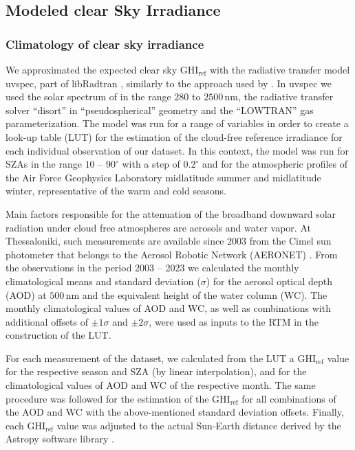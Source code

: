 \documentclass[preprint, 5p,
authoryear]{elsarticle} %
\begin{document}
\hypertarget{rtmcs}{%
\subsection{Modeled clear Sky Irradiance}\label{rtmcs}}

\hypertarget{climatology-of-clear-sky-irradiance}{%
\subsubsection{Climatology of clear sky
irradiance}\label{climatology-of-clear-sky-irradiance}}

We approximated the expected clear sky \(\text{GHI}_\text{ref}\) with
the radiative transfer model uvspec, part of libRadtran
\citep{Emde2016}, similarly to the approach used by
\citet{Vamvakas2020}. In uvspec we used the solar spectrum of
\citet{Kurucz1994} in the range \(280\) to \(2500\,\text{nm}\), the
radiative transfer solver ``disort'' in ``pseudospherical'' geometry and
the ``LOWTRAN'' gas parameterization. The model was run for a range of
variables in order to create a look-up table (LUT) for the estimation of
the cloud-free reference irradiance for each individual observation of
our dataset. In this context, the model was run for SZAs in the range
\(10\) -- \(90^\circ\) with a step of \(0.2^\circ\) and for the
atmospheric profiles of the Air Force Geophysics Laboratory
\citep{Anderson1986} midlatitude summer and midlatitude winter,
representative of the warm and cold seasons.

Main factors responsible for the attenuation of the broadband downward
solar radiation under cloud free atmospheres are aerosols and water
vapor. At Thessaloniki, such measurements are available since 2003 from
the Cimel sun photometer that belongs to the Aerosol Robotic Network
(AERONET) \citep{Giles2019, Buis1998}. From the observations in the
period 2003 -- 2023 we calculated the monthly climatological means and
standard deviation (\(\sigma\)) for the aerosol optical depth (AOD) at
\(500\,\text{nm}\) and the equivalent height of the water column (WC).
The monthly climatological values of AOD and WC, as well as combinations
with additional offsets of \(\pm1\sigma\) and \(\pm2\sigma\), were used
as inputs to the RTM in the construction of the LUT.

For each measurement of the dataset, we calculated from the LUT a
\(\text{GHI}_\text{ref}\) value for the respective season and SZA (by
linear interpolation), and for the climatological values of AOD and WC
of the respective month. The same procedure was followed for the
estimation of the \(\text{GHI}_\text{ref}\) for all combinations of the
AOD and WC with the above-mentioned standard deviation offsets. Finally,
each \(\text{GHI}_\text{ref}\) value was adjusted to the actual
Sun-Earth distance derived by the Astropy software library
\citep{AstropyCollaboration2022}.
\end{document}

